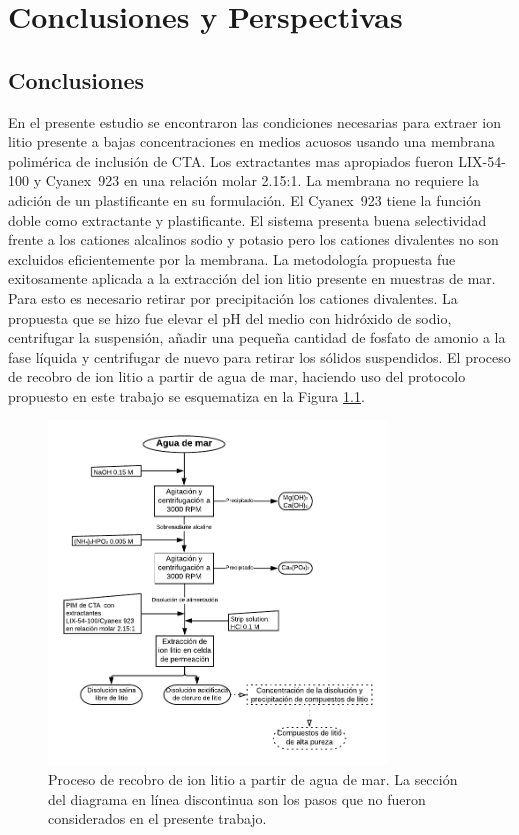 \chapter{Conclusiones y Perspectivas}
\section{Conclusiones}
En el presente estudio se encontraron las condiciones necesarias para extraer ion litio presente a bajas concentraciones en medios acuosos usando una membrana polimérica de inclusión de CTA. Los extractantes mas apropiados fueron LIX-54-100 y Cyanex~923 en una relación molar 2.15:1. La membrana no requiere la adición de un plastificante en su formulación. El Cyanex~923 tiene la función doble como extractante y plastificante. El sistema presenta buena selectividad frente a los cationes alcalinos sodio y potasio pero los cationes divalentes no son excluidos eficientemente por la membrana. La metodología propuesta fue exitosamente aplicada a la extracción del ion litio presente en muestras de mar. Para esto es necesario retirar por precipitación los cationes divalentes. La propuesta que se hizo fue elevar el pH del medio con hidróxido de sodio, centrifugar la suspensión, añadir una pequeña cantidad de fosfato de amonio a la fase líquida y centrifugar de nuevo para retirar los sólidos suspendidos. El proceso de recobro de ion litio a partir de agua de mar, haciendo uso del protocolo propuesto en este trabajo se esquematiza en la Figura \ref{fig:diagrama}.

{
\begin{figure}[h]
    \centering
    \includegraphics[width = 0.8\textwidth]{chap6/DiagramaProcesoLitioTesis.pdf}
    \caption[Proceso de recobro de ion litio a partir de agua de mar.]{Proceso de recobro de ion litio a partir de agua de mar. La sección del diagrama en línea discontinua son los pasos que no fueron considerados en el presente trabajo.}
    \label{fig:diagrama}
\end{figure}}

